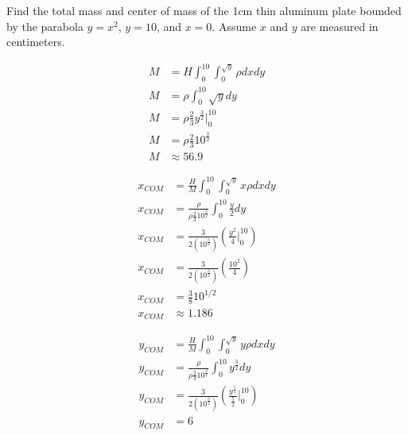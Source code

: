 Find the total mass and center of mass of the 1cm thin aluminum plate bounded by the parabola $y=x^2$, $y=10$, and $x=0$. Assume $x$ and $y$ are measured in centimeters.

\begin{solution}
    \begin{align*}
        M &= H\int_{0}^{10}\int_{0}^{\sqrt{y}}\rho dx dy \\
        M &= \rho \int_{0}^{10} \sqrt{y} dy \\
        M &= \rho \frac{2}{3} y^{\frac{3}{2}} \bigg|_{0}^{10} \\
        M &= \rho \frac{2}{3} 10^{\frac{3}{2}} \\
        M &\approx 56.9
    \end{align*}
    
    \begin{align*}
        x_{COM} &= \frac{H}{M}\int_{0}^{10}\int_{0}^{\sqrt{y}}x\rho dx dy \\
        x_{COM} &= \frac{\rho}{\rho \frac{2}{3} 10^{\frac{3}{2}}} \int_{0}^{10} \frac{y}{2} dy \\
        x_{COM} &= \frac{3}{2\left(10^\frac{3}{2}\right)} \left(\frac{y^2}{4} \bigg|_{0}^{10}\right) \\
        x_{COM} &= \frac{3}{2\left(10^\frac{3}{2}\right)} \left(\frac{10^2}{4}\right) \\
        x_{COM} &= \frac{3}{8} 10^{1/2} \\
        x_{COM} &\approx 1.186
    \end{align*}
    
    \begin{align*}
        y_{COM} &= \frac{H}{M}\int_{0}^{10}\int_{0}^{\sqrt{y}}y\rho dx dy \\
        y_{COM} &= \frac{\rho}{\rho \frac{2}{3} 10^{\frac{3}{2}}} \int_{0}^{10} y^{\frac{3}{2}} dy \\
        y_{COM} &= \frac{3}{2\left(10^\frac{3}{2}\right)} \left(\frac{y^{\frac{5}{2}}}{\frac{5}{2}} \bigg|_{0}^{10}\right) \\
        y_{COM} &= 6
    \end{align*}
\end{solution}